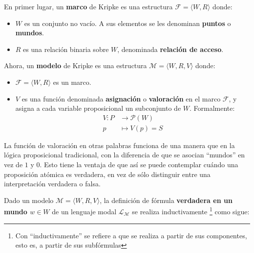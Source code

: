 \vspace{0.2cm}

\noindent
En primer lugar, un \textbf{marco} de Kripke es una estructura $\mathcal{F} = \langle W,R \rangle$ donde:

\begin{itemize}
    \item $W$ es un conjunto no vacío. A sus elementos se les denominan \textbf{puntos} o \textbf{mundos}.
    \item $R$ es una relación binaria sobre $W$, denominada \textbf{relación de acceso}.
\end{itemize}

\noindent
Ahora, un \textbf{modelo} de Kripke es una estructura $\mathcal{M} = \langle W,R,V \rangle$ donde:
\begin{itemize}
    \item $\mathcal{F} = \langle W,R \rangle$ es un marco.
    \item $V$ es una función denominada \textbf{asignación} o \textbf{valoración} en el marco $\mathcal{F}$, y asigna a cada variable proposicional un subconjunto de $W$. Formalmente:
    \begin{align*}
        V : P &\to \mathcal{P}(W) \\
        p &\mapsto V(p) = S
    \end{align*}
\end{itemize}

La función de valoración en otras palabras funciona de una manera que en la lógica proposicional tradicional, con la diferencia de que se asocian ``mundos'' en vez de $1$ y $0$. Esto tiene la ventaja de que así se puede contemplar cuándo una proposición atómica es verdadera, en vez de sólo distinguir entre una interpretación verdadera o falsa.

Dado un modelo $\mathcal{M} = \langle W,R,V \rangle$, la definición de fórmula \textbf{verdadera en un mundo $w \in W$} de un lenguaje modal $\mathcal{L}_{\mathcal{M}}$ se realiza inductivamente \footnote{Con ``inductivamente'' se refiere a que se realiza a partir de sus componentes, esto es, a partir de sus subfórmulas} \footnotemark{} como sigue:

